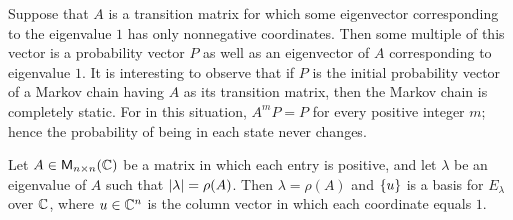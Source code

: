 \begin{note}
	Suppose that \(A\) is a transition matrix for which some eigenvector corresponding to the eigenvalue \(1\) has only nonnegative coordinates.
	Then some multiple of this vector is a probability vector \(P\) as well as an eigenvector of \(A\) corresponding to eigenvalue \(1\).
	It is interesting to observe that if \(P\) is the initial probability vector of a Markov chain having \(A\) as its transition matrix, then the Markov chain is completely static.
	For in this situation, \(A^m P = P\) for every positive integer \(m\);
	hence the probability of being in each state never changes.
\end{note}

\begin{thm}\label{5.18}
	Let \(A \in \ms[n][n][\C]\) be a matrix in which each entry is positive, and let \(\lambda\) be an eigenvalue of \(A\) such that \(\left\lvert\lambda\right\rvert = \rho(A)\).
	Then \(\lambda = \rho(A)\) and \(\left\lbrace u\right\rbrace\) is a basis for \(E_{\lambda}\) over \(\mathbb{C}\), where \(u \in \mathbb{C}^n\) is the column vector in which each coordinate equals \(1\).
\end{thm}

